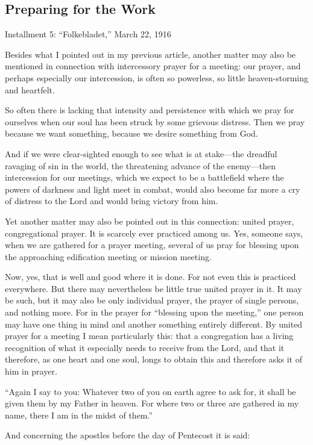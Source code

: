 
\subsection{Preparing for the Work}

Installment 5: “Folkebladet,” March 22, 1916

Besides what I pointed out in my previous article, another matter may also be mentioned in connection with intercessory prayer for a meeting: our prayer, and perhaps especially our intercession, is often so powerless, so little heaven-storming and heartfelt.

So often there is lacking that intensity and persistence with which we pray for ourselves when our soul has been struck by some grievous distress. Then we pray because we want something, because we desire something from God.

And if we were clear-sighted enough to see what is at stake—the dreadful ravaging of sin in the world, the threatening advance of the enemy—then intercession for our meetings, which we expect to be a battlefield where the powers of darkness and light meet in combat, would also become far more a cry of distress to the Lord and would bring victory from him.

Yet another matter may also be pointed out in this connection: united prayer, congregational prayer. It is scarcely ever practiced among us. Yes, someone says, when we are gathered for a prayer meeting, several of us pray for blessing upon the approaching edification meeting or mission meeting.

Now, yes, that is well and good where it is done. For not even this is practiced everywhere. But there may nevertheless be little true united prayer in it. It may be such, but it may also be only individual prayer, the prayer of single persons, and nothing more. For in the prayer for “blessing upon the meeting,” one person may have one thing in mind and another something entirely different. By united prayer for a meeting I mean particularly this: that a congregation has a living recognition of what it especially needs to receive from the Lord, and that it therefore, as one heart and one soul, longs to obtain this and therefore asks it of him in prayer.

“Again I say to you: Whatever two of you on earth agree to ask for, it shall be given them by my Father in heaven. For where two or three are gathered in my name, there I am in the midst of them.”

And concerning the apostles before the day of Pentecost it is said:

